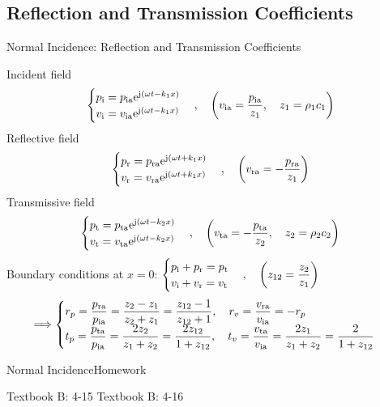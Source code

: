 \documentclass[9pt,mathserif]{beamer}
\begin{document}
\subsection{Reflection and Transmission Coefficients}
\begin{frame}{Normal Incidence: Reflection and Transmission Coefficients}
	\begin{outline}
		\1 Incident field
		$$
		\begin{cases}
			p\st{i} = p\st{ia}\me^{\mj(\omega t-k_1 x)}\\
			v\st{i} = v\st{ia} \me^{\mj (\omega t - k_1 x)}
		\end{cases}
		\qc \qty(v\st{ia} = \frac{p\st{ia}}{z_1}\qc z_1 = \rho_1 c_1)
		$$
		\1 Reflective field
		$$
		\begin{cases}
			p\st{r} = p\st{ra}\me^{\mj(\omega t+k_1 x)}\\
			v\st{r} = v\st{ra} \me^{\mj (\omega t + k_1 x)}
		\end{cases}
		\qc \qty(v\st{ra} = -\frac{p\st{ra}}{z_1})
		$$
		\1 Transmissive field
		$$
		\begin{cases}
			p\st{t} = p\st{ta}\me^{\mj(\omega t-k_2 x)}\\
			v\st{t} = v\st{ta} \me^{\mj (\omega t - k_2 x)}
		\end{cases}
		\qc \qty(v\st{ta} = -\frac{p\st{ta}}{z_2}\qc z_2 = \rho_2c_2)
		$$
		\1 Boundary conditions at $x=0$:
		$
		\begin{cases}
			p\st{i} +p\st{r} = p\st{t}\\
			v\st{i} +v\st{r} = v\st{t}
		\end{cases}
		\qc \qty(z_{12} = \dfrac{z_2}{z_1})
		$
		$$
		\imp
		\begin{cases}
		r_p = \dfrac{p\st{ra}}{p\st{ia}} =\dfrac{z_2-z_1}{z_2+z_1} = 
		\dfrac{z_{12}-1}{z_{12}+1}\qc r_v = \dfrac{v\st{ra}}{v\st{ia}} = -r_p\\
		t_p = \dfrac{p\st{ta}}{p\st{ia}} =\dfrac{2z_2}{z_1+z_2} = \dfrac{2z_{12}
	}{1+z_{12}}\qc t_v = \dfrac{v\st{ta}}{v\st{ia}} = \dfrac{2z_1}{z_1+z_2}
	=\dfrac{2}{1+z_{12}}
		\end{cases}
		$$
	\end{outline}

\end{frame}

\begin{frame}{Normal Incidence}{Homework}
	\begin{outline}[enumerate]
			\1 Textbook B: 4-15
			\1 Textbook B: 4-16
	\end{outline}
\end{frame}
\end{document}
